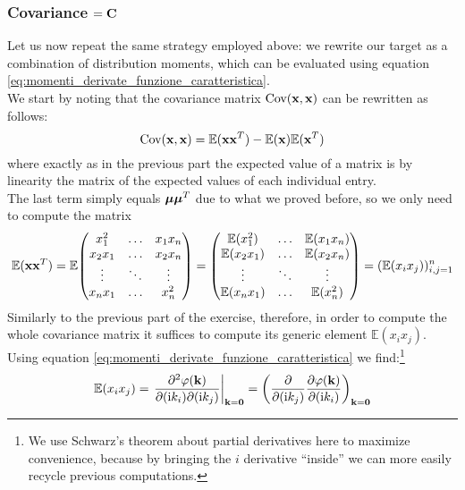 \documentclass[a4paper]{article}
\newcommand{\mat}[1]{\vb{#1}}
\let\temp\phi%
\let\phi\varphi
\let\varphi\temp
\renewcommand{\i}{\mathrm{i}} %
\begin{document}
\subsubsection{Covariance $=\mat{C}$}
Let us now repeat the same strategy employed above: we rewrite our target as a combination of distribution moments, which can be evaluated using equation \eqref{eq:momenti_derivate_funzione_caratteristica}.\\
We start by noting that the covariance matrix $\text{Cov}(\vb{x},\vb{x})$ can be rewritten as follows:
\begin{equation*}
    \text{Cov}(\vb{x},\vb{x}) = \mathbb{E}(\vb{x}\vb{x}^T) - \mathbb{E}(\vb{x})\mathbb{E}(\vb{x}^T)
\end{equation*}
where exactly as in the previous part the expected value of a matrix is by linearity the matrix of the expected values of each individual entry.\\
The last term simply equals $\vb*{\mu}\vb*{\mu}^T$ due to what we proved before, so we only need to compute the matrix
\begin{equation*}
    \mathbb{E}(\vb{x}\vb{x}^T) =
    \mathbb{E}
    \mqty(x_1^2 & \dots & x_1 x_n\\
    x_2 x_1 & \dots & x_2 x_n\\
    \vdots & \ddots & \vdots\\
    x_n x_1 & \dots & x_n^2)
    =
    \mqty(\mathbb{E}(x_1^2) & \dots & \mathbb{E}(x_1 x_n)\\
    \mathbb{E}(x_2 x_1) & \dots & \mathbb{E}(x_2 x_n)\\
    \vdots & \ddots & \vdots\\
    \mathbb{E}(x_n x_1) & \dots & \mathbb{E}(x_n^2)) =
    (\mathbb{E}(x_i x_j))_{i,j = 1}^n
\end{equation*}
Similarly to the previous part of the exercise, therefore, in order to compute the whole covariance matrix it suffices to compute its generic element $\mathbb{E}(x_ix_j)$.\\
Using equation \eqref{eq:momenti_derivate_funzione_caratteristica} we find:\footnote{We use Schwarz's theorem about partial derivatives here to maximize convenience, because by bringing the $i$ derivative ``inside'' we can more easily recycle previous computations.}
\begin{equation*}
    \mathbb{E}(x_ix_j) = \eval{\pdv{\phi (\vb{k})}{(\i k_i)}{(\i k_j)}}_{\vb{k}=\vb{0}} = \left(\pdv{(\i k_j)} \pdv{\phi (\vb{k})}{(\i k_i)}\right)_{\vb{k = \vb{0}}}
\end{equation*}
\end{document}
